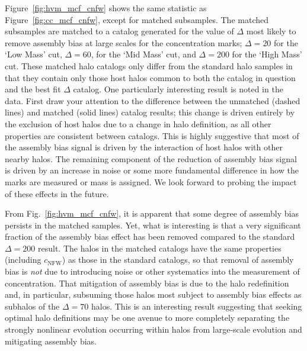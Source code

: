 \documentclass[usenatbib,fleqn]{mnras}
\begin{document}
Figure~\ref{fig:hvm_mcf_cnfw} shows the same statistic as Figure~\ref{fig:cc_mcf_cnfw}, except for matched
subsamples. The matched subsamples are matched to a catalog generated for the value of $\Delta$ most likely to
remove assembly bias at large scales for the concentration marks; $\Delta=20$ for the `Low Mass' cut, $\Delta=60$,
for the `Mid Mass' cut, and $\Delta=200$ for the `High Mass' cut. These matched halo catalogs only differ from
the standard halo samples in that they contain only those host halos common 
to both the catalog in question and the best fit $\Delta$ catalog. One particularly interesting result is noted in the \simB~ data. First draw your attention to the
difference between the unmatched (dashed lines) and matched (solid lines) catalog results; this change is driven entirely by the exclusion of host halos due to a change in halo definition, as all other properties are consistent between catalogs. This is highly suggestive that most of the assembly bias signal is driven by the interaction of host halos with other nearby halos. The remaining component of the reduction of assembly bias signal is driven by an increase in noise or some more fundamental difference in how the marks are measured or mass is assigned. We look forward to probing the impact of these effects in the future.

From Fig.~\ref{fig:hvm_mcf_cnfw}, it is apparent that some degree of assembly bias persists in the matched 
samples. Yet, what is interesting is that a very significant fraction of the assembly bias effect has been 
removed compared to the standard $\Delta=200$ result. The halos in the matched catalogs have the 
same properties (including $c_{\mathrm{NFW}}$) as those in the standard catalogs, so that removal 
of assembly bias is {\em not} due to introducing noise or other systematics into the measurement of 
concentration. That mitigation of assembly bias is due to the halo redefinition and, in particular, 
subsuming those halos most subject to assembly bias effects as subhalos of the $\Delta=70$ 
halos. This is an interesting result suggesting that seeking optimal halo definitions may be 
one avenue to more completely separating the strongly nonlinear evolution occurring within 
halos from large-scale evolution and mitigating assembly bias. 
\end{document}
